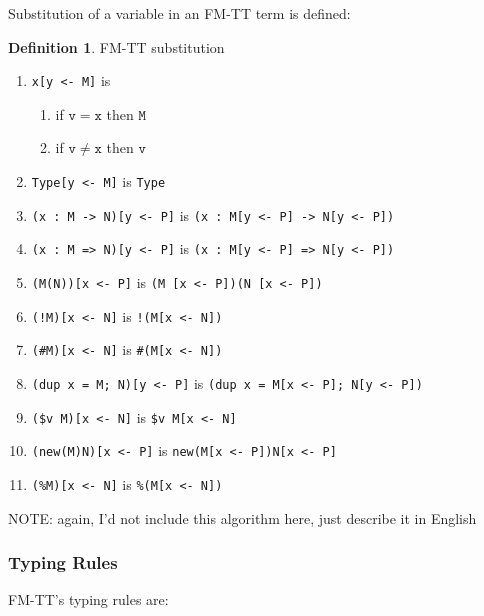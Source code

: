 \documentclass{article}
\theoremstyle{definition}
\newtheorem{definition}{Definition}
\theoremstyle{theorem}
\newcommand\code{\mathtt}
\begin{document}
Substitution of a variable in an FM-TT term is defined:
\begin{definition} FM-TT substitution
  \begin{enumerate}
    \item \verb|x[y <- M]| is
      \begin{enumerate}
        \item if $\code{v} = \code{x}$ then $\code{M}$
        \item if $\code{v} \neq \code{x}$ then $\code{v}$
      \end{enumerate}
    \item \verb|Type[y <- M]| is \verb|Type|
    \item \verb|(x : M -> N)[y <- P]| is \verb|(x : M[y <- P] -> N[y <- P])|
    \item \verb|(x : M => N)[y <- P]| is \verb|(x : M[y <- P] => N[y <- P])|
    \item \verb|(M(N))[x <- P]| is \verb|(M [x <- P])(N [x <- P])|
    \item \verb|(!M)[x <- N]| is \verb|!(M[x <- N])|
    \item \verb|(#M)[x <- N]| is \verb|#(M[x <- N])|
    \item \verb|(dup x = M; N)[y <- P]| is
          \verb|(dup x = M[x <- P]; N[y <- P])|
    \item \verb|($v M)[x <- N]| is \verb|$v M[x <- N]|
    \item \verb|(new(M)N)[x <- P]| is \verb|new(M[x <- P])N[x <- P]|
    \item \verb|(%M)[x <- N]| is \verb|%(M[x <- N])|
  \end{enumerate}
\end{definition}

NOTE: again, I'd not include this algorithm here, just describe it in English

\subsubsection{Typing Rules}

FM-TT's typing rules are:
\end{document}
